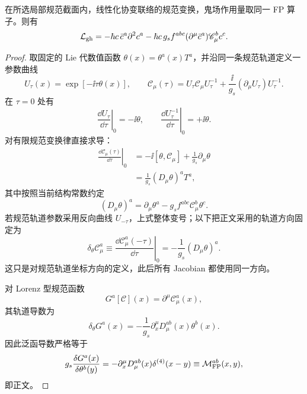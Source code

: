 \begin{proposition}[规范轨道微分与 FP 算子]
在所选局部规范截面内，线性化协变联络的规范变换，鬼场作用量取同一 FP 算子。则有
\begin{equation}
{
\mathcal L_{\rm gh}
=-\hbar c\,\bar c^a\partial^2c^a
-\hbar c\,g_sf^{abc}(\partial^\mu\bar c^a)\mathscr C_\mu^b c^c.}
\label{eq:qcd-ghost-expanded-dp68}
\end{equation}
\end{proposition}
\begin{proof}
取固定的 Lie 代数值函数 $\theta(x)=\theta^a(x)T^a$，并沿同一条规范轨道定义一参数曲线
\begin{equation*}
 U_\tau(x)=\exp[-\ii\tau\theta(x)],
 \qquad
 \mathscr C_\mu(\tau)
 =U_\tau\mathscr C_\mu U_\tau^{-1}
 +\frac{\ii}{g_s}(\partial_\mu U_\tau)U_\tau^{-1}.
\end{equation*}
在 $\tau=0$ 处有
\begin{equation*}
 \left.\frac{\dd U_\tau}{\dd\tau}\right|_0=-\ii\theta,
 \qquad
 \left.\frac{\dd U_\tau^{-1}}{\dd\tau}\right|_0=+\ii\theta .
\end{equation*}
对有限规范变换律直接求导：
\begin{align*}
 \left.\frac{\dd\mathscr C_\mu(\tau)}{\dd\tau}\right|_0
 &=-\ii[\theta,\mathscr C_\mu]
 +\frac1{g_s}\partial_\mu\theta\\
 &=\frac1{g_s}(D_\mu\theta)^aT^a,
\end{align*}
其中按照当前结构常数约定
\begin{equation*}
 (D_\mu\theta)^a
 =\partial_\mu\theta^a-g_sf^{abc}\mathscr C_\mu^b\theta^c.
\end{equation*}
若规范轨道参数采用反向曲线 $U_{-\tau}$，上式整体变号；以下把正文采用的轨道方向固定为
\begin{equation*}
 \delta_\theta\mathscr C_\mu^a
 \equiv
 \left.\frac{\dd\mathscr C_\mu^a(-\tau)}{\dd\tau}\right|_0
 =-\frac1{g_s}(D_\mu\theta)^a.
\end{equation*}
这只是对规范轨道坐标方向的定义，此后所有 Jacobian 都使用同一方向。

对 Lorenz 型规范函数
\begin{equation*}
 G^a[\mathscr C](x)=\partial^\mu\mathscr C_\mu^a(x),
\end{equation*}
其轨道导数为
\begin{equation*}
 \delta_\theta G^a(x)
 =-\frac1{g_s}\partial_x^\mu D_\mu^{ab}(x)\theta^b(x).
\end{equation*}
因此泛函导数严格等于
\begin{equation*}
 g_s\frac{\delta G^a(x)}{\delta\theta^b(y)}
 =-\partial_x^\mu D_\mu^{ab}(x)\delta^{(4)}(x-y)
 \equiv\mathcal M_{\rm FP}^{ab}(x,y),
\end{equation*}
即正文。


\end{proof}
